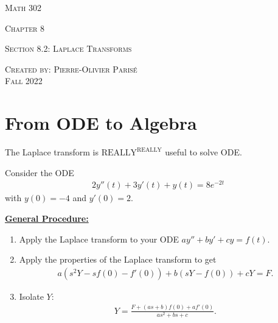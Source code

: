 \documentclass[12pt,a4paper]{article}
\newcounter{example}[section]
\begin{document}
\thispagestyle{empty}

\begin{center}
\vspace*{2.5cm}

{\Huge \textsc{Math 302}}

\vspace*{2cm}

{\LARGE \textsc{Chapter 8}} 

\vspace*{0.75cm}

\noindent\textsc{Section 8.2: Laplace Transforms}

\vspace*{0.75cm}

\tableofcontents

\vfill

\noindent \textsc{Created by: Pierre-Olivier Paris{\'e}} \\
\textsc{Fall 2022}
\end{center}

\newpage

\section{From ODE to Algebra}
	The Laplace transform is $\text{REALLY}^{\text{REALLY}}$ useful to solve ODE.
	
	\vspace*{14pt}
	
	\begin{example}\label{Ex:SolvingODE}
	Consider the ODE
		\begin{align*}
		2y'' (t) + 3y' (t) + y(t) = 8e^{-2t} 
		\end{align*}
	with $y(0) = -4$ and $y'(0) = 2$.
	\end{example}
	
	\newpage
	
	\phantom{2}
	
	\vfill
	
	\underline{\textbf{General Procedure:}}
	\begin{enumerate}
	\item Apply the Laplace transform to your ODE $ay'' + by' + cy = f(t)$.
	\item Apply the properties of the Laplace transform to get
		\begin{align*}
		a(s^2 Y - sf(0) - f'(0)) + b (s Y - f(0)) + c Y = F .
		\end{align*}
	\item Isolate $Y$:
		\begin{align*}
		Y = \frac{F + (as + b) f(0) + af'(0)}{as^2 + bs + c} .
		\end{align*}
	\end{enumerate}
	
\end{document}
